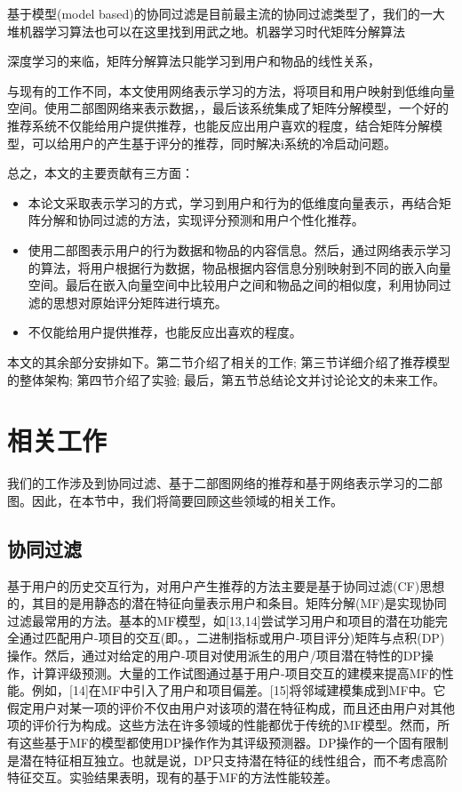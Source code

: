 \documentclass[lang=cn,11pt]{elegantpaper}
\begin{document}
基于模型(model based)的协同过滤是目前最主流的协同过滤类型了，我们的一大堆机器学习算法也可以在这里找到用武之地。机器学习时代矩阵分解算法


深度学习的来临，矩阵分解算法只能学习到用户和物品的线性关系，


与现有的工作不同，本文使用网络表示学习的方法，将项目和用户映射到低维向量空间。使用二部图网络来表示数据，，最后该系统集成了矩阵分解模型，一个好的推荐系统不仅能给用户提供推荐，也能反应出用户喜欢的程度，结合矩阵分解模型，可以给用户的产生基于评分的推荐，同时解决i系统的冷启动问题\cite{Qiu2011}。


总之，本文的主要贡献有三方面：
\begin{itemize}
	\item 本论文采取表示学习的方式，学习到用户和行为的低维度向量表示，再结合矩阵分解和协同过滤的方法，实现评分预测和用户个性化推荐。
	
	\item 使用二部图表示用户的行为数据和物品的内容信息。然后，通过网络表示学习的算法，将用户根据行为数据，物品根据内容信息分别映射到不同的嵌入向量空间。最后在嵌入向量空间中比较用户之间和物品之间的相似度，利用协同过滤的思想对原始评分矩阵进行填充。
	
	\item 不仅能给用户提供推荐，也能反应出喜欢的程度。
\end{itemize}

本文的其余部分安排如下。第二节介绍了相关的工作; 第三节详细介绍了推荐模型的整体架构; 第四节介绍了实验; 最后，第五节总结论文并讨论论文的未来工作。


\section{相关工作}

我们的工作涉及到协同过滤、基于二部图网络的推荐和基于网络表示学习的二部图。因此，在本节中，我们将简要回顾这些领域的相关工作。

\subsection{协同过滤}
基于用户的历史交互行为，对用户产生推荐的方法主要是基于协同过滤(CF)思想的\cite{Su2009}，其目的是用静态的潜在特征向量表示用户和条目。矩阵分解(MF)是实现协同过滤最常用的方法。基本的MF模型，如[13,14]尝试学习用户和项目的潜在功能完全通过匹配用户-项目的交互(即。，二进制指标或用户-项目评分)矩阵与点积(DP)操作。然后，通过对给定的用户-项目对使用派生的用户/项目潜在特性的DP操作，计算评级预测。大量的工作试图通过基于用户-项目交互的建模来提高MF的性能。例如，[14]在MF中引入了用户和项目偏差。[15]将邻域建模集成到MF中。它假定用户对某一项的评价不仅由用户对该项的潜在特征构成，而且还由用户对其他项的评价行为构成。这些方法在许多领域的性能都优于传统的MF模型。然而，所有这些基于MF的模型都使用DP操作作为其评级预测器。DP操作的一个固有限制是潜在特征相互独立。也就是说，DP只支持潜在特征的线性组合，而不考虑高阶特征交互。实验结果表明，现有的基于MF的方法性能较差。
\end{document}
